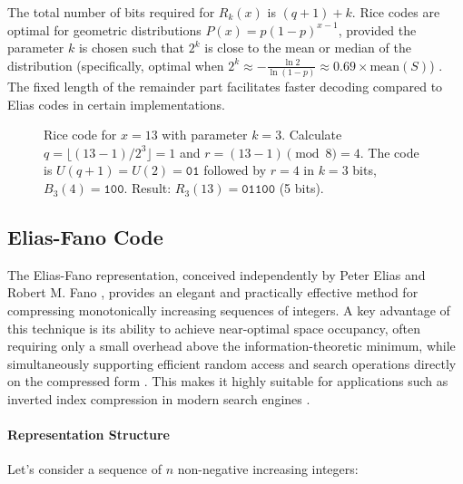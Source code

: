 \noindent The total number of bits required for $R_k(x)$ is $(q+1) + k$. Rice codes are optimal for geometric distributions $P(x) = p(1-p)^{x-1}$, provided the parameter $k$ is chosen such that $2^k$ is close to the mean or median of the distribution (specifically, optimal when $2^k \approx -\frac{\ln 2}{\ln(1-p)} \approx 0.69 \times \text{mean}(S)$) \cite{ferragina2023pearls, witten1999managing}. The fixed length of the remainder part facilitates faster decoding compared to Elias codes in certain implementations.

\begin{figure}[hbtp]
    \centering
    \caption{Rice code for $x=13$ with parameter $k=3$. Calculate $q = \lfloor (13-1) / 2^3 \rfloor = 1$ and $r = (13-1) \pmod 8 = 4$. The code is $U(q+1)=U(2)=\texttt{01}$ followed by $r=4$ in $k=3$ bits, $B_3(4)=\texttt{100}$. Result: $R_3(13)=\texttt{01100}$ (5 bits).}
    \label{fig:rice_code_example}

\end{figure}

\subsection{Elias-Fano Code} \label{sec:elias_fano_code}

The Elias-Fano representation, conceived independently by Peter Elias \cite{Elias1975} and Robert M. Fano \cite{Fano1971}, provides an elegant and practically effective method for compressing monotonically increasing sequences of integers. A key advantage of this technique is its ability to achieve near-optimal space occupancy, often requiring only a small overhead above the information-theoretic minimum, while simultaneously supporting efficient random access and search operations directly on the compressed form \cite{ferragina2023pearls, pibiri_et_al}. This makes it highly suitable for applications such as inverted index compression in modern search engines \cite{vigna2013quasi, EFVenturini2014}.

\paragraph{Representation Structure}
Let's consider a sequence of $n$ non-negative increasing integers:

